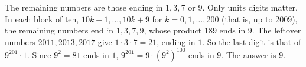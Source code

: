 The remaining numbers are those ending in $1,3,7$ or $9$. Only units digits matter. In each block of ten, $10k+1,\dots,10k+9$ for $k=0,1,\dots,200$ (that is, up to $2009$), the remaining numbers end in $1,3,7,9$, whose product $189$ ends in $9$. The leftover numbers $2011,2013,2017$ give $1\cdot3\cdot7=21$, ending in $1$. So the last digit is that of $9^{201}\cdot1$. Since $9^2=81$ ends in $1$, $9^{201}=9\cdot\left(9^2\right)^{100}$ ends in $9$. The answer is $\boxed{9}$.
